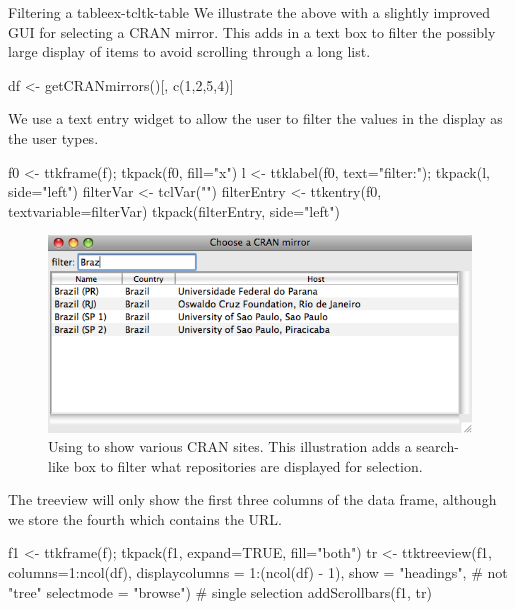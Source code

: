 \begin{example}{Filtering a table}{ex-tcltk-table}
%
We illustrate the above with a slightly improved GUI for selecting a CRAN mirror. This adds in a text box to filter the possibly large display of items to avoid scrolling through a long list. 
\begin{Schunk}
\begin{Sinput}
 df <- getCRANmirrors()[, c(1,2,5,4)]
\end{Sinput}
\end{Schunk}


We use a text entry widget to allow the user to filter the values in the display as the user types.
\begin{Schunk}
\begin{Sinput}
 f0 <- ttkframe(f); tkpack(f0, fill="x")
 l <- ttklabel(f0, text="filter:"); tkpack(l, side="left")
 filterVar <- tclVar("")
 filterEntry <- ttkentry(f0, textvariable=filterVar)
 tkpack(filterEntry, side="left")
\end{Sinput}
\end{Schunk}

\begin{figure}
  \centering
  \includegraphics[width=.8\textwidth]{fig-tcltk-filter-table.png}
  \caption{Using  to show various CRAN sites. This
    illustration adds a search-like box to filter what repositories
    are displayed for selection.}
  \label{fig:fig-tcltk-filter-table}
\end{figure}


The treeview  will only show the first three columns of the data frame, although we store the fourth which contains the URL.
\begin{Schunk}
\begin{Sinput}
 f1 <- ttkframe(f); tkpack(f1, expand=TRUE, fill="both")
 tr <- ttktreeview(f1, columns=1:ncol(df), 
                   displaycolumns = 1:(ncol(df) - 1), 
                   show = "headings",     # not "tree" 
                   selectmode = "browse") # single selection
 addScrollbars(f1, tr)
\end{Sinput}
\end{Schunk}


\end{example}
